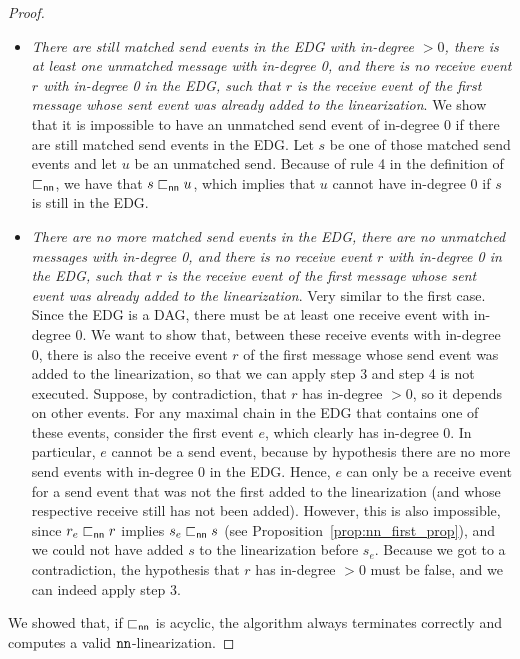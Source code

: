 \begin{proof}
\begin{itemize}
	\item \emph{There are still matched send events in the EDG with in-degree $>0$, there is at least one unmatched message with in-degree 0, and there is no receive event $r$ with in-degree 0 in the EDG, such that $r$ is the receive event of the first message whose sent event was already added to the linearization}. We show that it is impossible to have an unmatched send event of in-degree 0 if there are still matched send events in the EDG. Let $s$ be one of those matched send events and let $u$ be an unmatched send. Because of rule 4 in the definition of $\sqsubset_{\mathsf{nn}}$, we have that $s \sqsubset_{\mathsf{nn}} u$, which implies that $u$ cannot have in-degree 0 if $s$ is still in the EDG.
	\item \emph{There are no more matched send events in the EDG, there are no unmatched messages with in-degree 0, and there is no receive event $r$ with in-degree 0 in the EDG, such that $r$ is the receive event of the first message whose sent event was already added to the linearization}. Very similar to the first case. Since the EDG is a DAG, there must be at least one receive event with in-degree 0. We want to show that, between these receive events with in-degree 0, there is also the receive event $r$ of the first message whose send event was added to the linearization, so that we can apply step 3 and step 4 is not executed. Suppose, by contradiction, that $r$ has in-degree $>0$, so it depends on other events. For any maximal chain in the EDG that contains one of these events, consider the first event $e$, which clearly has in-degree 0. In particular, $e$ cannot be a send event, because by hypothesis there are no more send events with in-degree 0 in the EDG. Hence, $e$ can only be a receive event for a send event that was not the first added to the linearization (and whose respective receive still has not been added). However, this is also impossible, since $r_e \sqsubset_{\mathsf{nn}} r$ implies $s_e \sqsubset_{\mathsf{nn}} s$ (see Proposition~\ref{prop:nn_first_prop}), and we could not have added $s$ to the linearization before $s_e$. Because we got to a contradiction, the hypothesis that $r$ has in-degree $>0$ must be false, and we can indeed apply step 3.
\end{itemize}
We showed that, if $\sqsubset_{\mathsf{nn}}$ is acyclic, the algorithm always terminates correctly and computes a valid $\mathtt{nn}$-linearization.
\end{proof}
